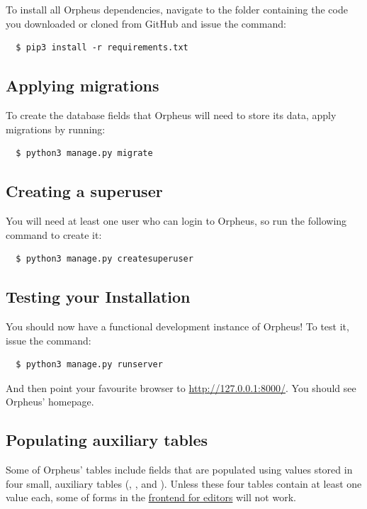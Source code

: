 \documentclass[british, 12pt]{article}
\begin{document}
To install all Orpheus dependencies, navigate to the folder containing the code you downloaded or cloned from GitHub and issue the command:

 \begin{lstlisting}
  $ pip3 install -r requirements.txt
 \end{lstlisting}

\subsection{Applying migrations}

To create the database fields that Orpheus will need to store its data, apply migrations by running:

 \begin{lstlisting}
  $ python3 manage.py migrate
 \end{lstlisting}

\subsection{Creating a superuser}

You will need at least one user who can login to Orpheus, so run the following command to create it:

 \begin{lstlisting}
  $ python3 manage.py createsuperuser
 \end{lstlisting} 
 
\subsection{Testing your Installation}

You should now have a functional development instance of Orpheus! To test it, issue the command:

\begin{lstlisting}
  $ python3 manage.py runserver
 \end{lstlisting}
 
And then point your favourite browser to \url{http://127.0.0.1:8000/}. You should see Orpheus' homepage.

\subsection{Populating auxiliary tables}

Some of Orpheus' tables include fields that are populated using values stored in four small, auxiliary tables (, ,  and ). Unless these four tables contain at least one value each, some of forms in the \hyperref[sec-frontend-for-editors]{frontend for editors} will not work.
\end{document}
